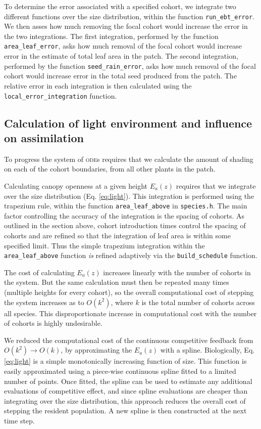 \documentclass[10pt,twoside]{article}
\begin{document}
To determine the error associated with a specified cohort, we integrate
two different functions over the size distribution, within the function
\texttt{run\_ebt\_error}. We then asses how much removing the focal
cohort would increase the error in the two integrations. The first
integration, performed by the function \texttt{area\_leaf\_error}, asks
how much removal of the focal cohort would increase error in the
estimate of total leaf area in the patch. The second integration,
performed by the function \texttt{seed\_rain\_error}, asks how much
removal of the focal cohort would increase error in the total seed
produced from the patch. The relative error in each integration is then
calculated using the \texttt{local\_error\_integration} function.

\subsection{Calculation of light environment and influence on
assimilation}\label{calculation-of-light-environment-and-influence-on-assimilation}

To progress the system of \textsc{ode}s requires that we calculate the amount of
shading on each of the cohort boundaries, from all other plants in the
patch.

Calculating canopy openness at a given height \(E_a(z)\) requires that
we integrate over the size distribution (Eq. \ref{eq:light}). This
integration is performed using the trapezium rule, within the function
\texttt{area\_leaf\_above} in \texttt{species.h}. The main factor
controlling the accuracy of the integration is the spacing of cohorts.
As outlined in the section above, cohort introduction times control the
spacing of cohorts and are refined so that the integration of leaf area
is within some specified limit. Thus the simple trapezium integration
within the \texttt{area\_leaf\_above} function \emph{is} refined
adaptively via the \texttt{build\_schedule} function.

The cost of calculating \(E_a(z)\) increases linearly with the number of
cohorts in the system. But the same calculation must then be repeated
many times (multiple heights for every cohort), so the overall computational cost
of stepping the system increases as to \(O(k^2)\), where \(k\) is the
total number of cohorts across all species. This disproportionate
increase in computational cost with the number of cohorts is highly undesirable.

We reduced the computational cost of the continuous competitive feedback
from \(O(k^2) \rightarrow O(k)\), by approximating the \(E_a(z)\) with a
spline. Biologically, Eq. \ref{eq:light} is a simple monotonically
increasing function of size. This function is easily
approximated using a piece-wise continuous spline fitted to a limited
number of points. Once fitted, the spline can be used to estimate any
additional evaluations of competitive effect, and since spline
evaluations are cheaper than integrating over the size distribution,
this approach reduces the overall cost of stepping the resident
population. A new spline is then constructed at the next time step.
\end{document}
